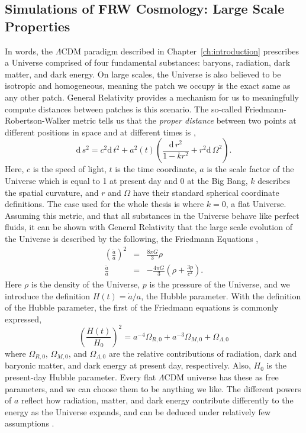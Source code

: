 \subsection{Simulations of FRW Cosmology: Large Scale Properties}

In words, the $\Lambda$CDM paradigm described in Chapter~\ref{ch:introduction} prescribes a Universe comprised of four fundamental substances: baryons, radiation, dark matter, and dark energy. On large scales, the Universe is also believed to be isotropic and homogeneous, meaning the patch we occupy is the exact same as any other patch. General Relativity provides a mechanism for us to meaningfully compute distances between patches is this scenario. The so-called Friedmann-Robertson-Walker metric tells us that the \textit{proper distance} between two points at different positions in space and at different times is \citep{kolb_turner, dodelson},
\begin{equation}
\text{d}\,s^2 = c^2 \text{d}\,t^2 + a^2(t) \left(\frac{\text{d}\,r^2}{1 - k r^2} + r^2\text{d}\,\Omega^2 \right).
\end{equation}
Here, $c$ is the speed of light, $t$ is the time coordinate, $a$ is the scale factor of the Universe which is equal to 1 at present day and 0 at the Big Bang, $k$ describes the spatial curvature, and $r$ and $\Omega$ have their standard spherical coordinate definitions. The case used for the whole thesis is where $k=0$, a flat Universe. Assuming this metric, and that all substances in the Universe behave like perfect fluids, it can be shown with General Relativity that the large scale evolution of the Universe is described by the following, the Friedmann Equations \citep{kolb_turner,dodelson},
\begin{eqnarray}
\left( \frac{\dot{a}}{a} \right)^2 &=& \frac{8 \pi G}{3} \rho\\
\frac{\ddot{a}}{a} &=& -\frac{4 \pi G}{3}\left(\rho + \frac{3 p}{c^2}\right).
\end{eqnarray}
Here $\rho$ is the density of the Universe, $p$ is the pressure of the Universe, and we introduce the definition $H(t) = \dot{a} / a$, the Hubble parameter. With the definition of the Hubble parameter, the first of the Friedmann equations is commonly expressed,
\begin{equation}
\left(\frac{H(t)}{H_0}\right)^2 = a^{-4} \Omega_{R,0} + a^{-3} \Omega_{M,0} + \Omega_{\Lambda,0}
\end{equation}
where $\Omega_{R,0}$, $\Omega_{M,0}$, and $\Omega_{\Lambda,0}$ are the relative contributions of radiation, dark and baryonic matter, and dark energy at present day, respectively. Also, $H_0$ is the present-day Hubble parameter. Every flat $\Lambda$CDM universe has these as free parameters, and we can choose them to be anything we like. The different powers of $a$ reflect how radiation, matter, and dark energy contribute differently to the energy as the Universe expands, and can be deduced under relatively few assumptions \citep{kolb_turner,dodelson}.

